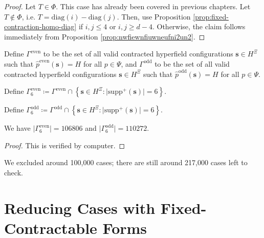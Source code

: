 \begin{proof}
    Let \( T \in \Phi \). This case has already been covered in previous chapters. Let \( T \notin \Phi \), i.e. \( T = \mathrm{diag}(i) - \mathrm{diag}(j) \). Then, use Proposition \ref{prop:fixed-contraction-homo-diag} if \( i,j \leq 4 \) or \( i,j \geq d-4 \). Otherwise, the claim follows immediately from Proposition \ref{prop:nwfiewnfiuwneufni2un2}.
\end{proof}


\begin{definition}
 Define \( \Gamma^{\mathrm{even}} \) to be the set of all valid contracted hyperfield configurations \( \mathbf{s} \in H^{\Xi} \) such that \( \hat p^{\mathrm{even}}(\mathbf{s}) = H \) for all \( p \in \Psi \), and \( \Gamma^{\mathrm{odd}} \) to be the set of all valid contracted hyperfield configurations \( \mathbf{s} \in H^{\Xi} \) such that \( \hat p^{\mathrm{odd}}(\mathbf{s}) = H \) for all \( p \in \Psi \). 

\end{definition}

\begin{definition}
    Define \( \Gamma^{\mathrm{even}}_6 \coloneqq \Gamma^{\mathrm{even}} \cap \left\{ \mathbf{s} \in H^{\Xi} : \lvert \mathrm{supp}^+(\mathbf{s}) \rvert = 6 \right\} \). 
    
    Define \( \Gamma^{\mathrm{odd}}_6 \coloneqq \Gamma^{\mathrm{odd}} \cap \left\{ \mathbf{s} \in H^{\Xi} : \lvert \mathrm{supp}^+(\mathbf{s}) \rvert = 6 \right\} \).

\end{definition}

\begin{proposition}
    We have \( \lvert \Gamma^{\mathrm{even}}_6 \rvert  = 106806\) and \( \lvert \Gamma^{\mathrm{odd}}_6 \rvert  = 110272\).
\end{proposition}

\begin{proof}
    This is verified by computer.
\end{proof}

We excluded around 100,000 cases; there are still around 217,000 cases left to check.

\section{Reducing Cases with Fixed-Contractable Forms}

